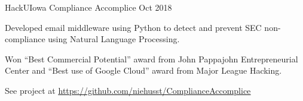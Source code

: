\documentclass[12pt, a4paper]{awesome-cv}
\begin{document}
\begin{cventries}

    \cventry
	{HackUIowa}
 	{Compliance Accomplice}
	{Oct 2018}
	{}
	{
	  \begin{cvitems}
	     \item{Developed email middleware using Python to detect and prevent SEC non-compliance using Natural Language Processing.}
	     \item{Won “Best Commercial Potential” award from John Pappajohn Entrepreneurial Center and “Best use of Google Cloud” award from Major League Hacking.}
	     \item{See project at \underline{\href{https://github.com/niehusst/ComplianceAccomplice}{https://github.com/niehusst/ComplianceAccomplice}}} 
	  \end{cvitems}
	}
\end{cventries}
\end{document}
